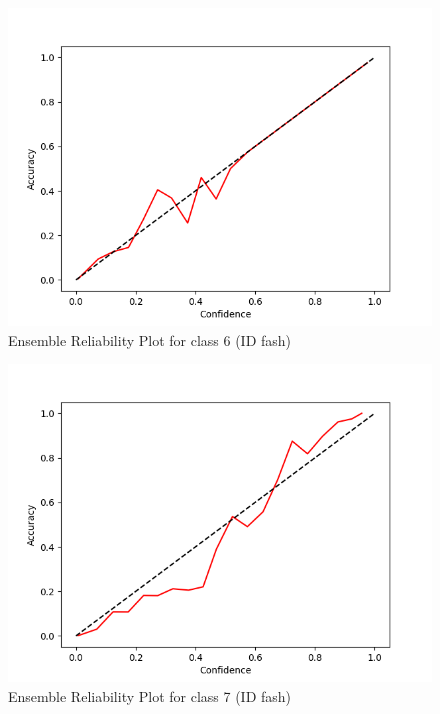 \documentclass[11pt]{article}
\begin{document}
\begin{figure}[htbp]
\centering
\includegraphics[width=.9\linewidth]{./ens_fash_rel_6.png}
\caption{\label{fig:org5fd780b}
Ensemble Reliability Plot for class 6 (ID fash)}
\end{figure}

\begin{figure}[htbp]
\centering
\includegraphics[width=.9\linewidth]{./ens_fash_rel_7.png}
\caption{\label{fig:orgadca54a}
Ensemble Reliability Plot for class 7 (ID fash)}
\end{figure}
\end{document}

